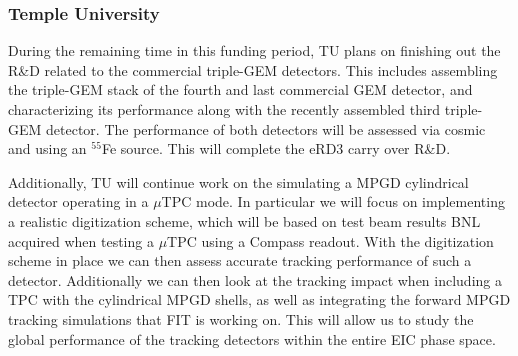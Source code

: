 \subsubsection{Temple University} 
During the remaining time in this funding period, TU plans on finishing out the R\&D related to the commercial triple-GEM detectors. This includes assembling the triple-GEM stack of the fourth and last commercial GEM detector, and characterizing its performance along with the recently assembled third triple-GEM detector. The performance of both detectors will be assessed via cosmic and using an $^{55}$Fe source. This will complete the eRD3 carry over R\&D.

Additionally, TU will continue work on the simulating a MPGD cylindrical detector operating in a $\mu$TPC mode. In particular we will focus on implementing a realistic digitization scheme, which will be based on test beam results BNL acquired when testing a $\mu$TPC using a Compass readout. With the digitization scheme in place we can then assess accurate tracking performance of such a detector. Additionally we can then look at the tracking impact when including a TPC with the cylindrical MPGD shells, as well as integrating the forward MPGD tracking simulations that FIT is working on. This will allow us to study the global performance of the tracking detectors within the entire EIC phase space.   
